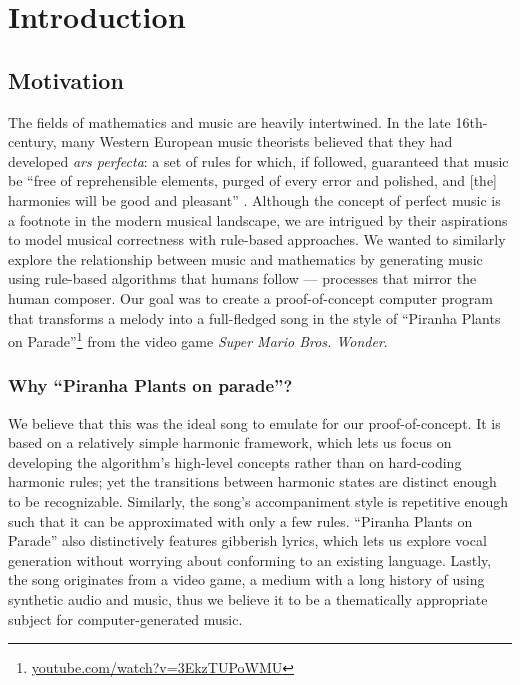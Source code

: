 \section{Introduction}

\subsection{Motivation}

The fields of mathematics and music are heavily intertwined. In the late 16th-century, many Western European music theorists believed that they had developed \emph{ars perfecta}: a set of rules for which, if followed, guaranteed that music be ``free of reprehensible elements, purged of every error and polished, and [the] harmonies will be good and pleasant'' \autocite{Richard:2005}. Although the concept of perfect music is a footnote in the modern musical landscape, we are intrigued by their aspirations to model musical correctness with rule-based approaches. We wanted to similarly explore the relationship between music and mathematics by generating music using rule-based algorithms that humans follow --- processes that mirror the human composer. Our goal was to create a proof-of-concept computer program that transforms a melody into a full-fledged song in the style of ``Piranha Plants on Parade''\footnote{\href{https://www.youtube.com/watch?v=3EkzTUPoWMU}{youtube.com/watch?v=3EkzTUPoWMU}} from the video game \emph{Super Mario Bros. Wonder}.

\subsubsection{Why ``Piranha Plants on parade''?}

We believe that this was the ideal song to emulate for our proof-of-concept. It is based on a relatively simple harmonic framework, which lets us focus on developing the algorithm's high-level concepts rather than on hard-coding harmonic rules; yet the transitions between harmonic states are distinct enough to be recognizable. Similarly, the song's accompaniment style is repetitive enough such that it can be approximated with only a few rules. ``Piranha Plants on Parade'' also distinctively features gibberish lyrics, which lets us explore vocal generation without worrying about conforming to an existing language. Lastly, the song originates from a video game, a medium with a long history of using synthetic audio and music, thus we believe it to be a thematically appropriate subject for computer-generated music.

